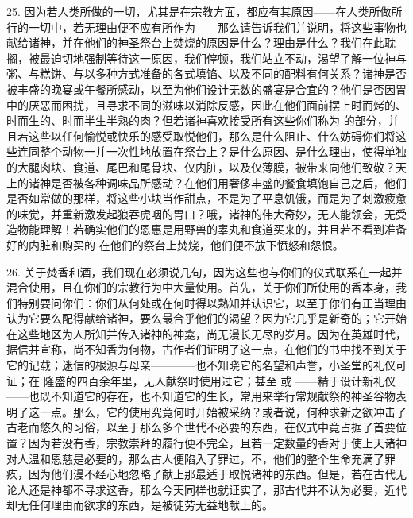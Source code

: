25. 因为若人类所做的一切，尤其是在宗教方面，都应有其原因——在人类所做所行的一切中，若无理由便不应有所作为——那么请告诉我们并说明，将这些事物也献给诸神，并在他们的神圣祭台上焚烧的原因是什么？理由是什么？我们在此耽搁，被最迫切地强制等待这一原因，我们停顿，我们站立不动，渴望了解一位神与粥、与糕饼、与以多种方式准备的各式填馅、以及不同的配料有何关系？诸神是否被丰盛的晚宴或午餐所感动，以至为他们设计无数的盛宴是合宜的？他们是否因胃中的厌恶而困扰，且寻求不同的滋味以消除反感，因此在他们面前摆上时而烤的、时而生的、时而半生半熟的肉？但若诸神喜欢接受所有这些你们称为  的部分，并且若这些以任何愉悦或快乐的感受取悦他们，那么是什么阻止、什么妨碍你们将这些连同整个动物一并一次性地放置在祭台上？是什么原因、是什么理由，使得单独的大腿肉块、食道、尾巴和尾骨块、仅内脏，以及仅薄膜，被带来向他们致敬？天上的诸神是否被各种调味品所感动？在他们用奢侈丰盛的餐食填饱自己之后，他们是否如常做的那样，将这些小块当作甜点，不是为了平息饥饿，而是为了刺激疲惫的味觉，并重新激发起狼吞虎咽的胃口？哦，诸神的伟大奇妙，无人能领会，无受造物能理解！若确实他们的恩惠是用野兽的睾丸和食道买来的，并且若不看到准备好的内脏和购买的  在他们的祭台上焚烧，他们便不放下愤怒和怨恨。\par

26. 关于焚香和酒，我们现在必须说几句，因为这些也与你们的仪式联系在一起并混合使用，且在你们的宗教行为中大量使用。首先，关于你们所使用的香本身，我们特别要问你们：你们从何处或在何时得以熟知并认识它，以至于你们有正当理由认为它要么配得献给诸神，要么最合乎他们的渴望？因为它几乎是新奇的；它开始在这些地区为人所知并传入诸神的神龛，尚无漫长无尽的岁月。因为在英雄时代，据信并宣称，尚不知香为何物，古作者们证明了这一点，在他们的书中找不到关于它的记载；迷信的根源与母亲————也不知晓它的名望和声誉，小圣堂的礼仪可证；在  隆盛的四百余年里，无人献祭时使用过它；甚至  或 ——精于设计新礼仪——也既不知道它的存在，也不知道它的生长，常用来举行常规献祭的神圣谷物表明了这一点。那么，它的使用究竟何时开始被采纳？或者说，何种求新之欲冲击了古老而悠久的习俗，以至于那么多个世代不必要的东西，在仪式中竟占据了首要位置？因为若没有香，宗教崇拜的履行便不完全，且若一定数量的香对于使上天诸神对人温和恩慈是必要的，那么古人便陷入了罪过，不，他们的整个生命充满了罪疚，因为他们漫不经心地忽略了献上那最适于取悦诸神的东西。但是，若在古代无论人还是神都不寻求这香，那么今天同样也就证实了，那古代并不认为必要，近代却无任何理由而欲求的东西，是被徒劳无益地献上的。\par

